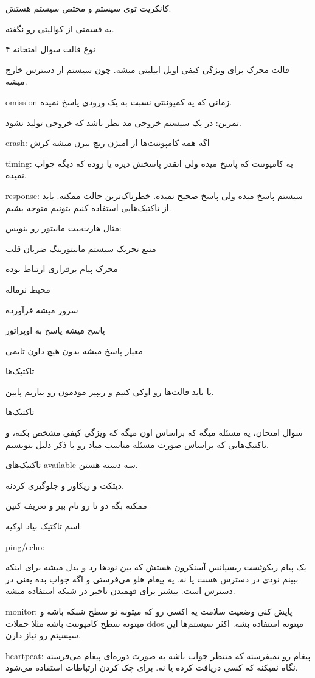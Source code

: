 کانکریت توی سیستم و مختص سیستم هستش.

یه قسمتی از کوالیتی رو نگفته.

۴ نوع فالت سوال امتحانه

فالت محرک برای ویژگی کیفی اویل ابیلیتی میشه. چون سیستم از دسترس خارج میشه.

omission زمانی که یه کمپوننتی نسبت به یک ورودی پاسخ نمیده.

تمرین: در یک سیستم خروجی مد نظر باشد که خروجی تولید نشود.

crash: اگه همه کامپوننت‌ها از امیژن رنج ببرن میشه کرش

timing: یه کامپوننت که پاسخ میده ولی انقدر پاسخش دیره یا زوده که دیگه جواب نمیده.

response: سیستم پاسخ میده ولی پاسخ صحیح نمیده. خطرناک‌ترین حالت ممکنه. باید از
تاکتیک‌هایی استفاده کنیم بتونیم متوجه بشیم.

مثال هارت‌بیت مانیتور رو بنویس:

منبع تحریک سیستم مانیتورینگ ضربان قلب

محرک پیام برقراری ارتباط بوده

محیط نرماله

سرور میشه فرآورده

پاسخ میشه پاسخ به اوپراتور

معیار پاسخ میشه بدون هیچ داون تایمی

تاکتیک‌ها

یا باید فالت‌ها رو اوکی کنیم و ریپیر مودمون رو بیاریم پایین.

تاکتیک‌ها

سوال امتحان، یه مسئله میگه که براساس اون میگه که ویژگی کیفی مشخص بکنه، و
تاکتیک‌هایی که براساس صورت مسئله مناسب میاد رو با ذکر دلیل بنویسیم.

تاکتیک‌های available سه دسته هستن.

دیتکت و ریکاور و جلوگیری کردنه. 

ممکنه بگه دو تا رو نام ببر و تعریف کنین

اسم تاکتیک بیاد اوکیه: 

ping/echo: 

یک پیام ریکوئست ریسپانس آسنکرون هستش که بین نود‌ها رد و بدل میشه برای اینکه
ببینم نودی در دسترس هست یا نه. یه پیغام هلو می‌فرستی و اگه جواب بده یعنی در
دسترس است. بیشتر برای فهمیدن تاخیر در شبکه استفاده میشه.

monitor: پایش کنی وضعیت سلامت یه اکسی رو که میتونه تو سطح شبکه باشه و میتونه سطح
کامپوننت باشه مثلا حملات ddos میتونه استفاده بشه. اکثر سیستم‌ها این سیسیتم رو
نیاز دارن.

heartpeat: پیغام رو نمیفرسته که متنظر جواب باشه به صورت دوره‌ای پیغام می‌فرسته
نگاه نمیکنه که کسی دریافت کرده یا نه. برای چک کردن ارتباطات استفاده می‌شود.

